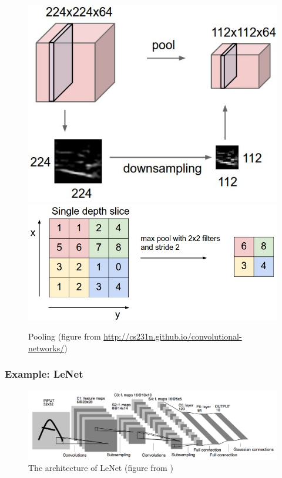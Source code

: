 \documentclass{article}
\begin{document}
\begin{figure}
\includegraphics[scale=0.2]{pool}
\includegraphics[scale=0.2]{maxpool}
\caption{Pooling (figure from \url{http://cs231n.github.io/convolutional-networks/})}
\end{figure}

\subsubsection{Example: LeNet}

\begin{figure}
\includegraphics[scale=0.1]{lenet}
\caption{The architecture of LeNet (figure from \cite{lecun1998gradient})}
\end{figure}
\end{document}
